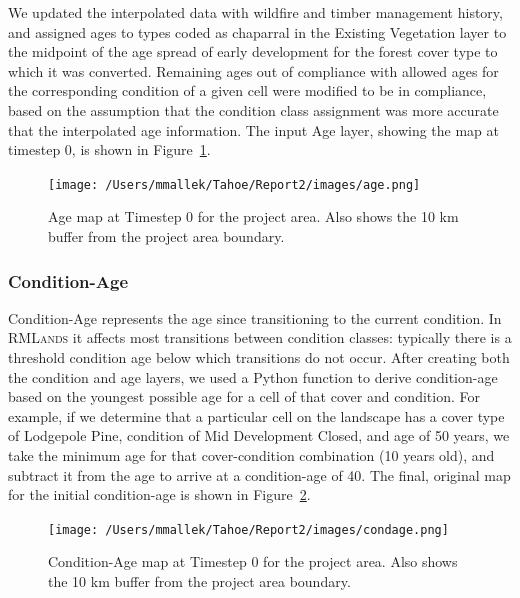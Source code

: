 We updated the interpolated data with wildfire and timber management history, and assigned ages to types coded as chaparral in the Existing Vegetation layer to the midpoint of the age spread of early development for the forest cover type to which it was converted. Remaining ages out of compliance with allowed ages for the corresponding condition of a given cell were modified to be in compliance, based on the assumption that the condition class assignment was more accurate that the interpolated age information. The input Age layer, showing the map at timestep 0, is shown in Figure~\ref{agemap}.

\begin{figure}[htbp]
\centering
\texttt{[image: /Users/mmallek/Tahoe/Report2/images/age.png]}
\caption{Age map at Timestep 0 for the project area. Also shows the 10 km buffer from the project area boundary.} 
\label{agemap}
\end{figure}

\subsubsection{Condition-Age}
Condition-Age represents the age since transitioning to the current condition. In \textsc{RMLands} it affects most transitions between condition classes: typically there is a threshold condition age below which transitions do not occur. After creating both the condition and age layers, we used a Python function to derive condition-age based on the youngest possible age for a cell of that cover and condition. For example, if we determine that a particular cell on the landscape has a cover type of Lodgepole Pine, condition of Mid Development Closed, and age of 50 years, we take the minimum age for that cover-condition combination (10 years old), and subtract it from the age to arrive at a condition-age of 40. The final, original map for the initial condition-age is shown in Figure~\ref{condagemap}.

\begin{figure}[htbp]
\centering
\texttt{[image: /Users/mmallek/Tahoe/Report2/images/condage.png]}
\caption{Condition-Age map at Timestep 0 for the project area. Also shows the 10 km buffer from the project area boundary.} 
\label{condagemap}
\end{figure}

